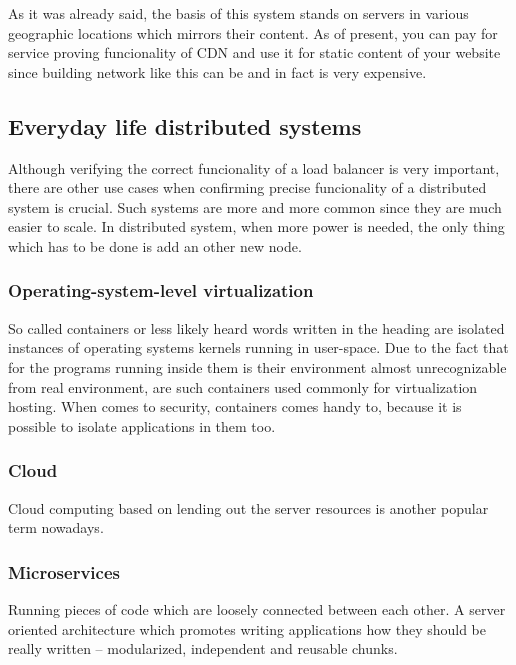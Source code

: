 \documentclass[
  master,
  biblatex,
  glossaries,
  index
]{kidiplom}
\begin{document}
As it was already said, the basis of this system stands on servers in various geographic locations which mirrors their content. As of present, you can pay for service proving funcionality of CDN and use it for static content of your website since building network like this can be and in fact is very expensive.

\subsection{Everyday life distributed systems}

Although verifying the correct funcionality of a load balancer is very important, there are other use cases when confirming precise funcionality of a distributed system is crucial. Such systems are more and more common since they are much easier to scale. In distributed system, when more power is needed, the only thing which has to be done is add an other new node. %

\subsubsection{Operating-system-level virtualization}

So called containers or less likely heard words written in the heading are isolated instances of operating systems kernels running in user-space. Due to the fact that for the programs running inside them is their environment almost unrecognizable from real environment, are such containers used commonly for virtualization hosting. When comes to security, containers comes handy to, because it is possible to isolate applications in them too. %

\subsubsection{Cloud}

Cloud computing based on lending out the server resources is another popular term nowadays.

\subsubsection{Microservices}

Running pieces of code which are loosely connected between each other. A server oriented architecture which promotes writing applications how they should be really written -- modularized, independent and reusable chunks. %
\end{document}
